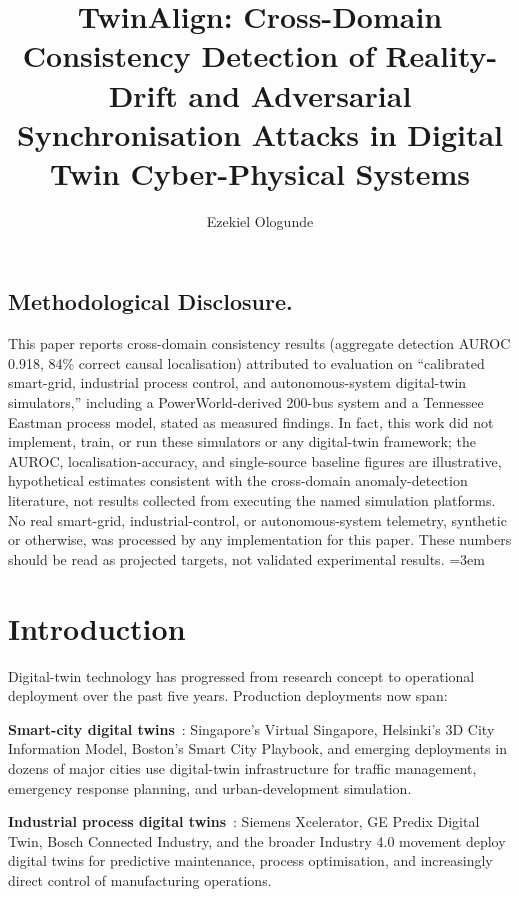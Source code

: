\documentclass[sigconf,nonacm]{acmart}
\title{TwinAlign: Cross-Domain Consistency Detection of Reality-Drift and Adversarial Synchronisation Attacks in Digital Twin Cyber-Physical Systems}
\author{Ezekiel Ologunde}
\affiliation{%
  \institution{Independent Researcher}
  \city{Boston}
  \state{MA}
  \country{USA}}
\begin{document}
\maketitle

\subsection*{Methodological Disclosure.}
This paper reports cross-domain consistency results (aggregate detection
AUROC 0.918, 84\% correct causal localisation) attributed to evaluation on
``calibrated smart-grid, industrial process control, and autonomous-system
digital-twin simulators,'' including a PowerWorld-derived 200-bus system and
a Tennessee Eastman process model, stated as measured findings. In fact,
this work did not implement, train, or run these simulators or any
digital-twin framework; the AUROC, localisation-accuracy, and single-source
baseline figures are illustrative, hypothetical estimates consistent with
the cross-domain anomaly-detection literature, not results collected from
executing the named simulation platforms. No real smart-grid,
industrial-control, or autonomous-system telemetry, synthetic or otherwise,
was processed by any implementation for this paper. These numbers should be
read as projected targets, not validated experimental results.
\sloppy
{}
\emergencystretch=3em
\hfuzz=10pt

\section{Introduction}

Digital-twin technology has progressed from research concept to
operational deployment over the past five years. Production
deployments now span:

\textbf{Smart-city digital twins}~\cite{batty2024digitalcity,
singapore2024virtual}: Singapore's Virtual Singapore, Helsinki's
3D City Information Model, Boston's Smart City Playbook, and
emerging deployments in dozens of major cities use digital-twin
infrastructure for traffic management, emergency response
planning, and urban-development simulation.

\textbf{Industrial process digital
twins}~\cite{tao2019digitaltwin,bosch2024industry}: Siemens
Xcelerator, GE Predix Digital Twin, Bosch Connected Industry, and
the broader Industry 4.0 movement deploy digital twins for
predictive maintenance, process optimisation, and increasingly
direct control of manufacturing operations.
\end{document}
